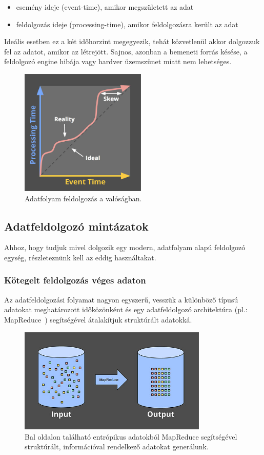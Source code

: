 \documentclass[a4paper,12pt]{article}
\begin{document}
\begin{itemize}
\item esemény ideje (event-time), amikor megszületett az adat
\item feldolgozás ideje (processing-time), amikor feldolgozásra került az adat
\end{itemize}
Ideális esetben ez a két időhorzint megegyezik, tehát közvetlenül akkor dolgozzuk fel az adatot, amikor az létrejött. Sajnos, azonban a bemeneti forrás késése, a feldolgozó engine hibája vagy hardver üzemszünet miatt nem lehetséges.
\begin{figure}[ht!]
\centering
\includegraphics[width=60mm]{img/skew.jpg}
\caption{Adatfolyam feldolgozás a valóságban. \label{skew}}
\end{figure}


\subsection{Adatfeldolgozó mintázatok}
Ahhoz, hogy tudjuk mivel dolgozik egy modern, adatfolyam alapú feldolgozó egység, részleteznünk kell az eddig használtakat.

\subsubsection{Kötegelt feldolgozás véges adaton}
Az adatfeldolgozási folyamat nagyon egyszerű, vesszük a különböző típusú adatokat meghatározott időközönként és egy adatfeldolgozó architektúra (pl.: MapReduce~\cite{mapreduce}) segítségével átalakítjuk struktúrált adatokká.

\begin{figure}[ht!]
\centering
\includegraphics[width=90mm]{img/batch.jpg}
\caption{Bal oldalon található entrópikus adatokból MapReduce segítségével struktúrált, információval rendelkező adatokat generálunk. \label{batchreduce}}
\end{figure}
\end{document}
